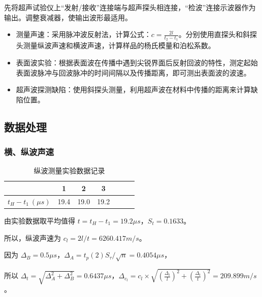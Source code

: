 \documentclass[a4paper]{article}
\begin{document}
        \par 先将超声试验仪上“发射/接收”连接端与超声探头相连接，“检波”连接示波器作为输出。调整衰减器，使输出波形最适用。

        \begin{itemize}
            \item 测量声速：采用脉冲波反射法，计算公式：$c=\frac{2l}{t_2-t_1}$。分别使用直探头和斜探头测量纵波声速和横波声速，计算样品的杨氏模量和泊松系数。
            \item 表面波实验：根据表面波在传播中遇到尖锐界面后反射回波的特性，测定起始表面波脉冲与回波脉冲的时间间隔以及传播距离，即可测出表面波的波速。
            \item 超声波探测缺陷：使用斜探头测量，利用超声波在材料中传播的距离来计算缺陷位置。
        \end{itemize}
    
    \subsection{数据处理}

        \subsubsection{横、纵波声速}

            \begin{table}[H]
                \centering
                \begin{tabular}{|c|c|c|c|c|c|c|}
                    \hline
                                        & 1         & 2         & 3         \\ \hline
                    $t_H-t_1\ (\mu s)$  & 19.4      & 19.0      & 19.2      \\ \hline
                \end{tabular}
                \caption{纵波测量实验数据记录}
            \end{table}

            \par 由实验数据取平均值得 $t=t_H-t_1=19.2\mu s$，$S_t=0.1633$。

            \par 所以，纵波声速为 $c_l=2l/t=6260.417m/s$。

            \par 因为 $\Delta_B=0.5\mu s$，$\Delta_A=t_p(2)S_{\tau}/\sqrt{n}=0.4054\mu s$，

            \par 所以 $\Delta_t=\sqrt{\Delta^2_A+\Delta^2_B}=0.6437\mu s$，$\Delta_{c_l}=c_l\times\sqrt{(\frac{\Delta_l}{l})^2+(\frac{\Delta_t}{t})^2}=209.899m/s$。
\end{document}
